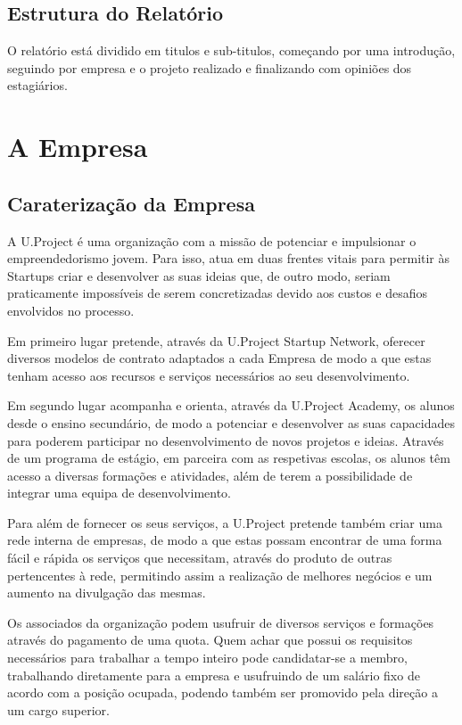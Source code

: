 \documentclass[11pt]{report}
\begin{document}
\section{Estrutura do Relatório}
O relatório está dividido em titulos e sub-titulos, começando por uma introdução, seguindo por empresa e o projeto realizado e finalizando com opiniões dos estagiários.
\chapter{A Empresa}

\section{Caraterização da Empresa}
A U.Project é uma organização com a missão de potenciar e impulsionar o empreendedorismo jovem. Para isso, atua em duas frentes vitais para permitir às Startups criar e desenvolver as suas ideias que, de outro modo, seriam praticamente impossíveis de serem concretizadas devido aos custos e desafios envolvidos no processo.

Em primeiro lugar pretende, através da U.Project Startup Network, oferecer diversos modelos de contrato adaptados a cada Empresa de modo a que estas tenham acesso aos recursos e serviços necessários ao seu desenvolvimento.

Em segundo lugar acompanha e orienta, através da U.Project Academy, os alunos desde o ensino secundário, de modo a potenciar e desenvolver as suas capacidades para poderem participar no desenvolvimento de novos projetos e ideias. Através de um programa de estágio, em parceira com as respetivas escolas, os alunos têm acesso a diversas formações e atividades, além de terem a possibilidade de integrar uma equipa de desenvolvimento.

Para além de fornecer os seus serviços, a U.Project pretende também criar uma rede interna de empresas, de modo a que estas possam encontrar de uma forma fácil e rápida os serviços que necessitam, através do produto de outras pertencentes à rede, permitindo assim a realização de melhores negócios e um aumento na divulgação das mesmas.

Os associados da organização podem usufruir de diversos serviços e formações através do pagamento de uma quota. Quem achar que possui os requisitos necessários para trabalhar a tempo inteiro pode candidatar-se a membro, trabalhando diretamente para a empresa e usufruindo de um salário fixo de acordo com a posição ocupada, podendo também ser promovido pela direção a um cargo superior.
\end{document}
